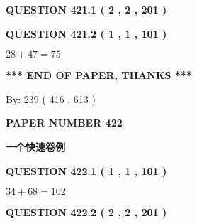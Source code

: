 \documentclass{ctexart}
\begin{document}
{\textbf{\Large{QUESTION
421.1 
 ( 2 , 2 , 201 )
}}}
  
  
  
\vspace{0.2in}
  
{\textbf{\Large{QUESTION
421.2 
 ( 1 , 1 , 101 )
}}}
  
  
 
 

$ %
28 +  %
47=   %
75$
 
 
   
   
 \vspace{0.2in}
 
   
   
   
   
\vspace{1.0in} 
{\textbf{\large{ *** END OF PAPER, THANKS *** }}} 
   
   
\hspace{1.0in} By: 
 239 ( 416 ,  613 )
   
   
   
   
\newpage 
\setcounter{page}{ 
   422001 } 
   
   
   
   
 {\textbf{ \Large{ PAPER NUMBER  422  }}}
   
   
\vspace{0.2in}
   
   
   
   
   
   
 \vspace{0.2in}
{\LARGE {\textbf{ 一个快速卷例}}}
   
   
  
\vspace{0.2in}
  
{\textbf{\Large{QUESTION
422.1 
 ( 1 , 1 , 101 )
}}}
  
  
 
 

$ %
34 +  %
68=   %
102$
 
 
  
\vspace{0.2in}
  
{\textbf{\Large{QUESTION
422.2 
 ( 2 , 2 , 201 )
}}}
  
  
   
   
 \vspace{0.2in}
 
   
   
\end{document}
